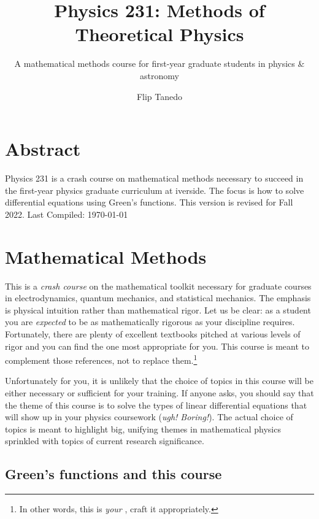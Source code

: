 \documentclass[
  11pt,
	colorful,
	raggedright,
]{tufte-style-thesis-flip}
\author{Flip Tanedo}
\title{Physics 231: Methods of Theoretical Physics}
\subtitle{A mathematical methods course for first-year graduate students in physics \& astronomy}
\begin{document}
\maketitle

\frontmatter

\chapter{Abstract}
Physics 231 is a crash course on mathematical methods necessary to succeed in the first-year physics graduate curriculum at iverside. 
%
The focus is how to solve differential equations using Green's functions. This version is revised for Fall 2022. Last Compiled: \today


\tableofcontents


\mainmatter

\chapter{Mathematical Methods}

This is a \emph{crash course} on the mathematical toolkit necessary for graduate courses in electrodynamics, quantum mechanics, and statistical mechanics. The emphasis is physical intuition rather than mathematical rigor. Let us be clear: as a student you are \emph{expected} to be as mathematically rigorous as your discipline requires. Fortunately, there are plenty of excellent textbooks pitched at various levels of rigor and you can find the one most appropriate for you. This course is meant to complement those references, not to replace them.\footnote{In other words, this is \emph{your} , craft it appropriately.}

Unfortunately for you, it is unlikely that the choice of topics in this course will be either necessary or sufficient for your training. If anyone asks, you should say that the theme of this course is to solve the types of linear differential equations that will show up in your physics coursework (\emph{ugh! Boring!}). The actual choice of topics is meant to highlight big, unifying themes in mathematical physics sprinkled with topics of current research significance.

\section{Green's functions and this course}
\end{document}
